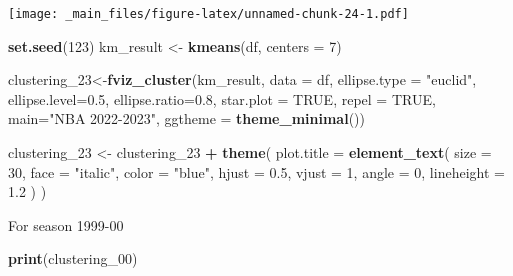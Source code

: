 \documentclass[
]{book}
\newenvironment{Shaded}{\begin{snugshade}}{\end{snugshade}}
\newcommand{\AttributeTok}[1]{\textcolor[rgb]{0.13,0.29,0.53}{#1}}
\newcommand{\ConstantTok}[1]{\textcolor[rgb]{0.56,0.35,0.01}{#1}}
\newcommand{\DecValTok}[1]{\textcolor[rgb]{0.00,0.00,0.81}{#1}}
\newcommand{\FloatTok}[1]{\textcolor[rgb]{0.00,0.00,0.81}{#1}}
\newcommand{\FunctionTok}[1]{\textcolor[rgb]{0.13,0.29,0.53}{\textbf{#1}}}
\newcommand{\NormalTok}[1]{#1}
\newcommand{\OtherTok}[1]{\textcolor[rgb]{0.56,0.35,0.01}{#1}}
\newcommand{\SpecialCharTok}[1]{\textcolor[rgb]{0.81,0.36,0.00}{\textbf{#1}}}
\newcommand{\StringTok}[1]{\textcolor[rgb]{0.31,0.60,0.02}{#1}}
\theoremstyle{definition}
\theoremstyle{definition}
\theoremstyle{definition}
\theoremstyle{definition}
\theoremstyle{remark}
\begin{document}
\texttt{[image: \_main\_files/figure-latex/unnamed-chunk-24-1.pdf]}

\begin{Shaded}
\begin{Highlighting}[]
\FunctionTok{set.seed}\NormalTok{(}\DecValTok{123}\NormalTok{)}
\NormalTok{km\_result }\OtherTok{\textless{}{-}} \FunctionTok{kmeans}\NormalTok{(df, }\AttributeTok{centers =} \DecValTok{7}\NormalTok{)}
\end{Highlighting}
\end{Shaded}

\begin{Shaded}
\begin{Highlighting}[]
\NormalTok{clustering\_23}\OtherTok{\textless{}{-}}\FunctionTok{fviz\_cluster}\NormalTok{(km\_result, }\AttributeTok{data =}\NormalTok{ df,}
             \AttributeTok{ellipse.type =} \StringTok{"euclid"}\NormalTok{,}
             \AttributeTok{ellipse.level=}\FloatTok{0.5}\NormalTok{,}
             \AttributeTok{ellipse.ratio=}\FloatTok{0.8}\NormalTok{,}
             \AttributeTok{star.plot =} \ConstantTok{TRUE}\NormalTok{,}
             \AttributeTok{repel =} \ConstantTok{TRUE}\NormalTok{,}
             \AttributeTok{main=}\StringTok{"NBA 2022{-}2023"}\NormalTok{,}
             \AttributeTok{ggtheme =} \FunctionTok{theme\_minimal}\NormalTok{())}

\NormalTok{clustering\_23 }\OtherTok{\textless{}{-}}\NormalTok{ clustering\_23 }\SpecialCharTok{+}
  \FunctionTok{theme}\NormalTok{(}
    \AttributeTok{plot.title =} \FunctionTok{element\_text}\NormalTok{(}
      \AttributeTok{size =} \DecValTok{30}\NormalTok{,               }
      \AttributeTok{face =} \StringTok{"italic"}\NormalTok{,}
      \AttributeTok{color =} \StringTok{"blue"}\NormalTok{,          }
      \AttributeTok{hjust =} \FloatTok{0.5}\NormalTok{,            }
      \AttributeTok{vjust =} \DecValTok{1}\NormalTok{,               }
      \AttributeTok{angle =} \DecValTok{0}\NormalTok{,               }
      \AttributeTok{lineheight =} \FloatTok{1.2}         
\NormalTok{    )}
\NormalTok{  )}
\end{Highlighting}
\end{Shaded}

For season 1999-00

\begin{Shaded}
\begin{Highlighting}[]
\FunctionTok{print}\NormalTok{(clustering\_00)}
\end{Highlighting}
\end{Shaded}
\end{document}
